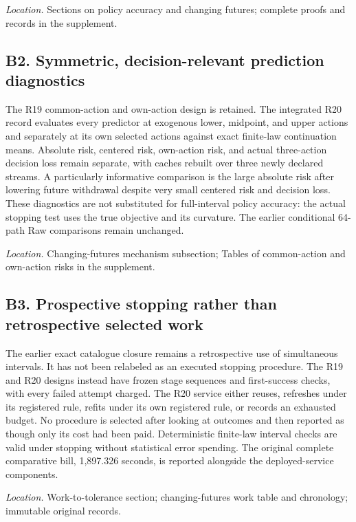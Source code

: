 \documentclass[ecta,nameyear,draft]{econsocart}
\theoremstyle{definition}
\theoremstyle{remark}
\begin{document}
\par\smallskip\noindent\emph{Location.} Sections on policy accuracy and changing futures; complete proofs and records in the supplement.

\subsection*{B2. Symmetric, decision-relevant prediction diagnostics}

The R19 common-action and own-action design is retained. The integrated R20 record evaluates every predictor at exogenous lower, midpoint, and upper actions and separately at its own selected actions against exact finite-law continuation means. Absolute risk, centered risk, own-action risk, and actual three-action decision loss remain separate, with caches rebuilt over three newly declared streams. A particularly informative comparison is the large absolute risk after lowering future withdrawal despite very small centered risk and decision loss. These diagnostics are not substituted for full-interval policy accuracy: the actual stopping test uses the true objective and its curvature. The earlier conditional 64-path Raw comparisons remain unchanged.


\par\smallskip\noindent\emph{Location.} Changing-futures mechanism subsection; Tables of common-action and own-action risks in the supplement.

\subsection*{B3. Prospective stopping rather than retrospective selected work}

The earlier exact catalogue closure remains a retrospective use of simultaneous intervals. It has not been relabeled as an executed stopping procedure. The R19 and R20 designs instead have frozen stage sequences and first-success checks, with every failed attempt charged. The R20 service either reuses, refreshes under its registered rule, refits under its own registered rule, or records an exhausted budget. No procedure is selected after looking at outcomes and then reported as though only its cost had been paid. Deterministic finite-law interval checks are valid under stopping without statistical error spending. The original complete comparative bill, 1,897.326 seconds, is reported alongside the deployed-service components.


\par\smallskip\noindent\emph{Location.} Work-to-tolerance section; changing-futures work table and chronology; immutable original records.
\end{document}
